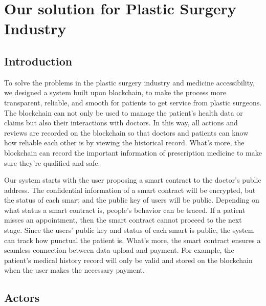 \documentclass{article}
\begin{document}
\section{Our solution for Plastic Surgery Industry}
\subsection{Introduction}
To solve the problems in the plastic surgery industry and medicine accessibility, we designed a system built upon blockchain, to make the process more transparent, reliable, and smooth for patients to get service from plastic surgeons. The blockchain can not only be used to manage the patient's health data or claims but also their interactions with doctors. In this way, all actions and reviews are recorded on the blockchain so that doctors and patients can know how reliable each other is by viewing the historical record. What's more, the blockchain can record the important information of prescription medicine to make sure they're qualified and safe.
\par Our system starts with the user proposing a smart contract to the doctor's public address. The confidential information of a smart contract will be encrypted, but the status of each smart and the public key of users will be public. Depending on what status a smart contract is, people's behavior can be traced. If a patient misses an appointment, then the smart contract cannot proceed to the next stage. Since the users' public key and status of each smart is public, the system can track how punctual the patient is. What's more, the smart contract ensures a seamless connection between data upload and payment. For example, the patient's medical history record will only be valid and stored on the blockchain when the user makes the necessary payment.
\subsection{Actors}
\end{document}
